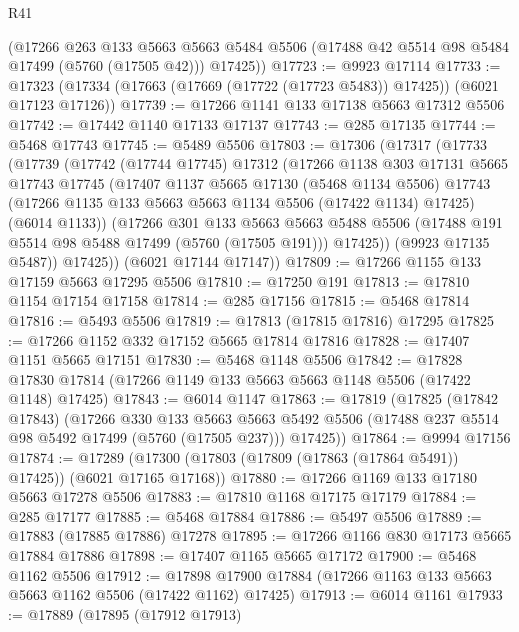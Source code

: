 \begin{lexlean}{R41}
\begin{coremodule}
      (@17266
        @263
        @133
        @5663
        @5663
        @5484
        @5506
        (@17488 @42 @5514 @98 @5484 @17499 (@5760 (@17505 @42)))
        @17425))
@17723 := @9923 @17114
@17733 := @17323 (@17334 (@17663 (@17669 (@17722 (@17723 @5483)) @17425)) (@6021 @17123 @17126))
@17739 := @17266 @1141 @133 @17138 @5663 @17312 @5506
@17742 := @17442 @1140 @17133 @17137
@17743 := @285 @17135
@17744 := @5468 @17743
@17745 := @5489 @5506
@17803 := @17306
    (@17317
      (@17733
        (@17739
          (@17742
            (@17744 @17745)
            @17312
            (@17266
              @1138
              @303
              @17131
              @5665
              @17743
              @17745
              (@17407
                @1137
                @5665
                @17130
                (@5468 @1134 @5506)
                @17743
                (@17266 @1135 @133 @5663 @5663 @1134 @5506 (@17422 @1134) @17425)
                (@6014 @1133))
              (@17266
                @301
                @133
                @5663
                @5663
                @5488
                @5506
                (@17488 @191 @5514 @98 @5488 @17499 (@5760 (@17505 @191)))
                @17425))
            (@9923 @17135 @5487))
          @17425))
      (@6021 @17144 @17147))
@17809 := @17266 @1155 @133 @17159 @5663 @17295 @5506
@17810 := @17250 @191
@17813 := @17810 @1154 @17154 @17158
@17814 := @285 @17156
@17815 := @5468 @17814
@17816 := @5493 @5506
@17819 := @17813 (@17815 @17816) @17295
@17825 := @17266 @1152 @332 @17152 @5665 @17814 @17816
@17828 := @17407 @1151 @5665 @17151
@17830 := @5468 @1148 @5506
@17842 := @17828 @17830 @17814 (@17266 @1149 @133 @5663 @5663 @1148 @5506 (@17422 @1148) @17425)
@17843 := @6014 @1147
@17863 := @17819
    (@17825
      (@17842 @17843)
      (@17266
        @330
        @133
        @5663
        @5663
        @5492
        @5506
        (@17488 @237 @5514 @98 @5492 @17499 (@5760 (@17505 @237)))
        @17425))
@17864 := @9994 @17156
@17874 := @17289 (@17300 (@17803 (@17809 (@17863 (@17864 @5491)) @17425)) (@6021 @17165 @17168))
@17880 := @17266 @1169 @133 @17180 @5663 @17278 @5506
@17883 := @17810 @1168 @17175 @17179
@17884 := @285 @17177
@17885 := @5468 @17884
@17886 := @5497 @5506
@17889 := @17883 (@17885 @17886) @17278
@17895 := @17266 @1166 @830 @17173 @5665 @17884 @17886
@17898 := @17407 @1165 @5665 @17172
@17900 := @5468 @1162 @5506
@17912 := @17898 @17900 @17884 (@17266 @1163 @133 @5663 @5663 @1162 @5506 (@17422 @1162) @17425)
@17913 := @6014 @1161
@17933 := @17889
    (@17895
      (@17912 @17913)

\end{coremodule}
\end{lexlean}
